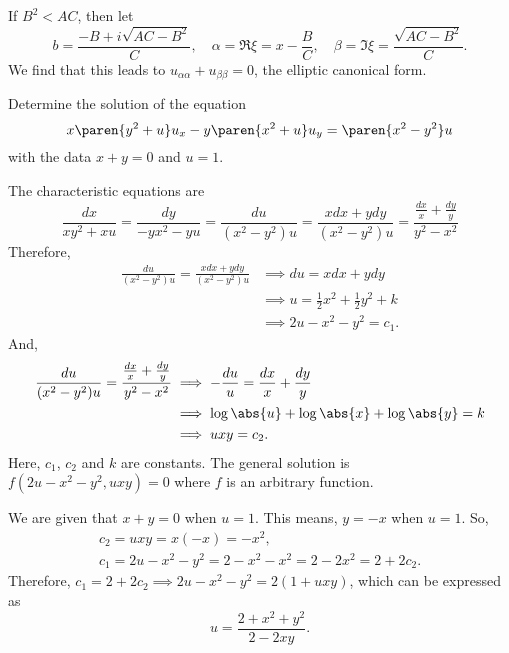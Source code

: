 \documentclass[11pt]{penrose}
\begin{document}
\begin{problem}{2}
    If $B^2 < AC$, then let
    \begin{equation*}
        b = \frac{-B + i\sqrt{AC - B^2}}{C},\quad
        \alpha = \Re \xi = x - \frac{B}{C}, \quad
        \beta = \Im \xi = \frac{\sqrt{AC-B^2}}{C}.
    \end{equation*}
    We find that this leads to $u_{\alpha\alpha} + u_{\beta\beta} = 0$, the elliptic canonical form.
\end{problem}

\begin{problem}{3}
    Determine the solution of the equation
    \begin{equation*}
        x \paren{y^2 + u} u_x - y \paren{x^2 + u} u_y = \paren{x^2 - y^2} u
    \end{equation*}
    with the data $x + y = 0$ and $u = 1$.

    \solution The characteristic equations are
    \begin{equation*}
        \frac{dx}{xy^2 + xu}
        = \frac{dy}{-yx^2 - yu}
        = \frac{du}{(x^2 - y^2)u}
        = \frac{xdx+ydy}{(x^2 - y^2)u}
        = \frac{\frac{dx}{x}+\frac{dy}{y}}{y^2 - x^2}
    \end{equation*}
    Therefore,
    \begin{align*}
        \frac{du}{(x^2 - y^2)u} = \frac{xdx+ydy}{(x^2 - y^2)u}
        &\implies
        du = xdx+ydy\\
        &\implies
        u = \frac{1}{2}x^2 + \frac{1}{2}y^2 + k\\
        &\implies
        2u - x^2 - y^2 = c_1.
    \end{align*}
    And,
    \begin{align*}
        \frac{du}{(x^2 - y^2)u} = \frac{\frac{dx}{x}+\frac{dy}{y}}{y^2 - x^2}
        &\implies
        -\frac{du}{u} = \frac{dx}{x} + \frac{dy}{y}\\
        &\implies
        \log\abs{u} + \log\abs{x} + \log\abs{y} = k\\
        &\implies
        uxy = c_2.
    \end{align*}
    Here, $c_1$, $c_2$ and $k$ are constants. The general solution is $f(2u - x^2 - y^2, uxy) = 0$ where $f$ is an arbitrary function.

    We are given that $x+y = 0$ when $u=1$. This means, $y = -x$ when $u=1$. So,
    \begin{gather*}
        c_2 = uxy = x(-x) = -x^2,\\
        c_1 = 2u - x^2 - y^2 = 2 - x^2 - x^2 = 2 - 2x^2 = 2 + 2c_2.
    \end{gather*}
    Therefore, $c_1 = 2 + 2c_2 \implies 2u - x^2 - y^2 = 2(1 + uxy)$, which can be expressed as
    \begin{equation*}
        u = \frac{2+x^2+y^2}{2-2xy}.
    \end{equation*}
\end{problem}
\end{document}
